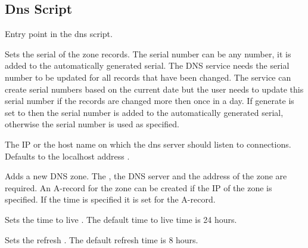 \subsection{Dns Script}



Entry point in the dns script.


Sets the serial  of the zone records.
The serial number can be any number, it is added to the automatically
generated serial. The DNS service needs the serial number to be updated
for all records that have been changed. The service can create serial
numbers based on the current date but the user needs to update this
serial number if the records are changed more then once in a day.
If generate is set to  then the serial number is added to
the automatically generated serial, otherwise the serial number is used 
as specified.


The IP  or the host name on which the dns server should listen
to connections. Defaults to the localhost address .


Adds a new DNS zone. The , the  DNS server and 
the  address of the zone are required. An A-record for the zone
can be created if the IP  of the zone is specified. If the
 time is specified it is set for the A-record.


Sets the time to live . The default time to live time is 24 hours.


Sets the refresh . The default refresh time is 8 hours.


